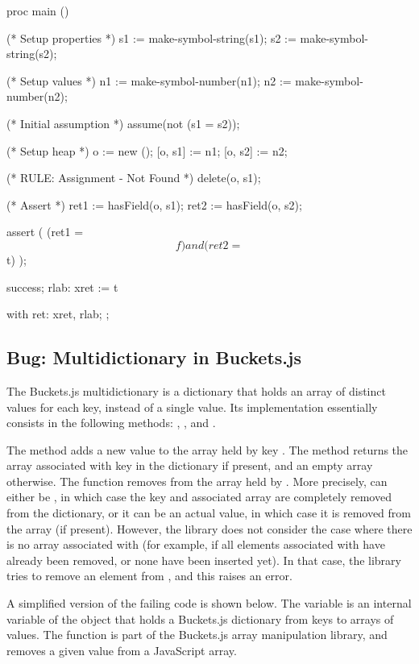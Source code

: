 \begin{lstjs}
proc main () {
    (* Setup properties *)
    s1 := make-symbol-string(s1);
    s2 := make-symbol-string(s2);

    (* Setup values *)
    n1 := make-symbol-number(n1);
    n2 := make-symbol-number(n2);

    (* Initial assumption *)
    assume(not (s1 = s2));

    (* Setup heap *)
    o := new ();
    [o, s1] := n1;
    [o, s2] := n2;

    (* RULE: Assignment - Not Found *)
    delete(o, s1);

    (* Assert *)
    ret1 := hasField(o, s1);
    ret2 := hasField(o, s2);

    assert (
        (ret1 = $$f) and (ret2 = $$t)
    );

    success;
    rlab:   xret := $$t
}
with
{
    ret:    xret, rlab;
};
\end{lstjs}
 
\subsection{Bug: Multidictionary in Buckets.js}

The Buckets.js multidictionary is a dictionary that holds an array of distinct values for each key, instead of a single value.
Its implementation essentially consists in the following methods: , , and .

The  method adds a new value  to the array held by key .
The  method returns the array associated with key  in the dictionary if present, and an empty array otherwise.
The  function removes  from the array held by .
More precisely,  can either be , in which case the key and associated array are completely removed from the dictionary, or it can be an actual value, in which case it is removed from the array (if present).
However, the library does not consider the case where there is no array associated with  (for example, if all elements associated with  have already been removed, or none have been inserted yet).
In that case, the library tries to remove an element from , and this raises an error.

A simplified version of the failing code is shown below.
The  variable is an internal variable of the  object that holds a Buckets.js dictionary from keys to arrays of values.
The  function is part of the Buckets.js array manipulation library, and removes a given value from a JavaScript array.

